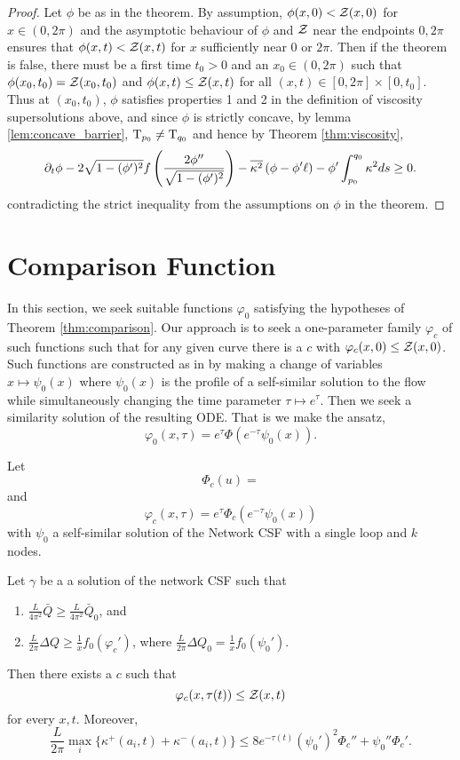 \documentclass[a4paper, 12pt]{amsart}
\begin{document}
\begin{proof}
Let $\phi$ be as in the theorem. By assumption, $\phi(x, 0) < \operatorname{\mathcal{Z}}(x, 0)$ for $x\in (0,2\pi)$ and the asymptotic behaviour of $\phi$ and $\operatorname{\mathcal{Z}}$ near the endpoints $0,2\pi$ ensures that $\phi(x, t) < \operatorname{\mathcal{Z}}(x, t)$ for $x$ sufficiently near $0$ or $2\pi$. Then if the theorem is false, there must be a first time $t_0>0$ and an $x_0\in(0,2\pi)$ such that $\phi(x_0, t_0) = \operatorname{\mathcal{Z}}(x_0, t_0)$ and $\phi(x, t) \leq \operatorname{\mathcal{Z}}(x, t)$ for all $(x,t) \in [0,2\pi] \times [0, t_0]$. Thus at $(x_0,t_0)$, $\phi$ satisfies properties 1 and 2 in the definition of viscosity supersolutions above, and since $\phi$ is strictly concave, by lemma \ref{lem:concave_barrier}, $\operatorname{T}_{p_0} \ne \operatorname{T}_{q_0}$ and hence by Theorem \ref{thm:viscosity},
\[
\partial_t\phi - 2\sqrt{1 - (\phi')^2}f\left(\frac{2\phi''}{\sqrt{1-(\phi')^2}}\right) - \overline{{\kappa^2}} \left(\phi - \phi'\ell\right) - \phi' \int_{p_0}^{q_0} \kappa^2 ds \geq 0.
\]
contradicting the strict inequality from the assumptions on $\phi$ in the theorem.
\end{proof}

\section{Comparison Function}
\label{sec:comparison_function}

In this section, we seek suitable functions $\varphi_0$ satisfying the hypotheses of Theorem \ref{thm:comparison}. Our approach is to seek a one-parameter family $\varphi_c$ of such functions such that for any given curve there is a $c$ with $\varphi_c(x, 0) \leq \operatorname{\mathcal{Z}}(x, 0)$. Such functions are constructed as in \cite{MR2794630} by making a change of variables $x \mapsto \psi_0(x)$ where $\psi_0(x)$ is the profile of a self-similar solution to the flow while simultaneously changing the time parameter $\tau \mapsto e^{\tau}$. Then we seek a similarity solution of the resulting ODE. That is we make the ansatz,
\[
\varphi_0(x, \tau) = e^{\tau} \Phi(e^{-\tau} \psi_0(x)).
\]

\begin{thm}
\label{thm:comparison_function}
Let
\[
\Phi_c(u) = 
\]
and
\[
\varphi_c(x, \tau) = e^{\tau} \Phi_c(e^{-\tau} \psi_0(x))
\]
with $\psi_0$ a self-similar solution of the Network CSF with a single loop and $k$ nodes.

Let $\gamma$ be a a solution of the network CSF such that
\begin{enumerate}
\item $\frac{L}{4\pi^2} \bar{Q} \geq \frac{L}{4\pi^2} \bar{Q}_0$, and
\item $\frac{L}{2\pi} \Delta Q \geq \tfrac{1}{x} f_0(\varphi_c')$, where $\frac{L}{2\pi} \Delta Q_0 = \tfrac{1}{x} f_0(\psi_0')$.
\end{enumerate}
Then there exists a $c$ such that
\[
\varphi_c(x, \tau(t)) \leq \operatorname{\mathcal{Z}}(x, t)
\]
for every $x, t$. Moreover,
\[
\frac{L}{2\pi} \max_i \{\kappa^+(a_i, t) + \kappa^-(a_i, t)\} \leq 8 e^{-\tau(t)} (\psi_0')^2 \Phi_c'' + \psi_0'' \Phi_c'.
\]
\end{thm}
\end{document}
